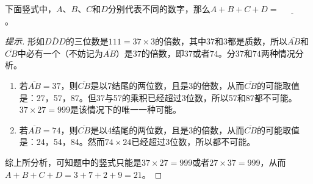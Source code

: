 \begin{example}
  下面竖式中，$A$、$B$、$C$和$D$分别代表不同的数字，那么$A+B+C+D=\underline{\phantom{ABCD}}$。
  \begin{center}
  \end{center}
\end{example}
\begin{proof}[提示]
  形如$\overline{DDD}$的三位数是$111=37\times 3$的倍数，其中$37$和$3$都是质数，所以$\overline{AB}$和$\overline{CB}$中必有一个（不妨记为$\overline{AB}$）是$37$的倍数，即$37$或者$74$。分$37$和$74$两种情况分析。
  \begin{enumerate}
  \item 若$\overline{AB}=37$，则$\overline{CB}$是以7结尾的两位数，且是3的倍数，从而$\overline{CB}$的可能取值是：27，57，87。但37与57的乘积已经超过3位数，所以57和87都不可能。$37\times27=999$是该情况下的唯一一种可能。
  \item 若$\overline{AB}=74$，则$\overline{CB}$是以4结尾的两位数，且是3的倍数，从而$\overline{CB}$的可能取值是：24，54，84。然而$74\times24$已经超过3位数，所以都不可能。
  \end{enumerate}

  综上所分析，可知题中的竖式只能是$37\times27=999$或者$27\times37=999$，从而$A+B+C+D=3+7+2+9=21$。
\end{proof}



